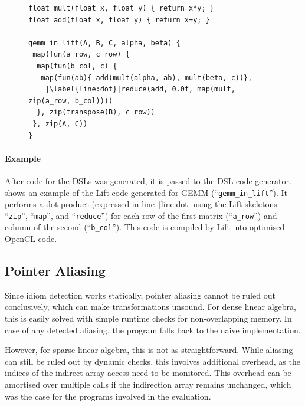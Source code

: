 \begin{figure}[H]
\begin{lstlisting}[language=LIFT,escapechar=|,
                   label={fig:liftmxm},caption=
   {GEMM in Lift is expressed with the higher-order functions
    ``{\tt zip}'', ``{\tt map}'', ``{\tt reduce}''.\leftskip=0pt\rightskip=0pt}]
float mult(float x, float y) { return x*y; }
float add(float x, float y) { return x+y; }

gemm_in_lift(A, B, C, alpha, beta) {
 map(fun(a_row, c_row) {
  map(fun(b_col, c) {
   map(fun(ab){ add(mult(alpha, ab), mult(beta, c))},
    |\label{line:dot}|reduce(add, 0.0f, map(mult, zip(a_row, b_col))))
  }, zip(transpose(B), c_row))
 }, zip(A, C))
}
\end{lstlisting}
\end{figure}

    \paragraph*{Example}
    After code for the DSLs was generated, it is passed to the DSL code
    generator.
     shows an example of the Lift code generated for GEMM
    (``{\tt gemm\_in\_lift}'').
    It performs a dot product (expressed in line~\ref{line:dot} using the Lift
    skeletons ``{\tt zip}'', ``{\tt map}'', and ``{\tt reduce}'') for each row
    of the first matrix (``{\tt a\_row}'') and column of the second
    (``{\tt b\_col}'').
    This code is compiled by Lift into optimised OpenCL code.

\subsection{Pointer Aliasing}

    Since idiom detection works statically, pointer aliasing cannot be ruled out
    conclusively, which can make transformations unsound.
    For dense linear algebra, this is easily solved with simple runtime
    checks for non-overlapping memory.
    In case of any detected aliasing, the program falls back to the naive
    implementation.

    However, for sparse linear algebra, this is not as straightforward.
    While aliasing can still be ruled out by dynamic checks, this involves
    additional overhead, as the indices of the indirect array access need to
    be monitored.
    This overhead can be amortised over multiple calls if the indirection array
    remains unchanged, which was the case for the programs involved in the
    evaluation.


